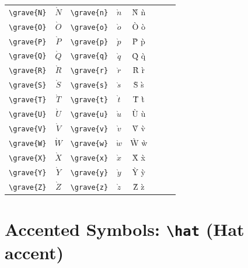 \documentclass[12pt,a4paper]{article}
\begin{document}
\begin{longtable}{|l|c|l|c|c|l|c|c|}
\verb|\grave{N}| & $\grave{N}$     & \verb|\grave{n}| & $\grave{n}$     & Ǹ ǹ            &                  &                 & \\
\verb|\grave{O}| & $\grave{O}$     & \verb|\grave{o}| & $\grave{o}$     & Ò ò            &                  &                 & \\
\verb|\grave{P}| & $\grave{P}$     & \verb|\grave{p}| & $\grave{p}$     & P̀ p̀            &                  &                 & \\
\verb|\grave{Q}| & $\grave{Q}$     & \verb|\grave{q}| & $\grave{q}$     & Q̀ q̀            &                  &                 & \\
\verb|\grave{R}| & $\grave{R}$     & \verb|\grave{r}| & $\grave{r}$     & R̀ r̀            &                  &                 & \\
\verb|\grave{S}| & $\grave{S}$     & \verb|\grave{s}| & $\grave{s}$     & S̀ s̀            &                  &                 & \\
\verb|\grave{T}| & $\grave{T}$     & \verb|\grave{t}| & $\grave{t}$     & T̀ t̀            &                  &                 & \\
\verb|\grave{U}| & $\grave{U}$     & \verb|\grave{u}| & $\grave{u}$     & Ù ù            &                  &                 & \\
\verb|\grave{V}| & $\grave{V}$     & \verb|\grave{v}| & $\grave{v}$     & V̀ v̀            &                  &                 & \\
\verb|\grave{W}| & $\grave{W}$     & \verb|\grave{w}| & $\grave{w}$     & Ẁ ẁ            &                  &                 & \\
\verb|\grave{X}| & $\grave{X}$     & \verb|\grave{x}| & $\grave{x}$     & X̀ x̀            &                  &                 & \\
\verb|\grave{Y}| & $\grave{Y}$     & \verb|\grave{y}| & $\grave{y}$     & Ỳ ỳ            &                  &                 & \\
\verb|\grave{Z}| & $\grave{Z}$     & \verb|\grave{z}| & $\grave{z}$     & Z̀ z̀            &                  &                 & \\
\hline
\end{longtable}

\newpage

\section*{Accented Symbols: \texttt{\textbackslash hat} (Hat accent)}
\end{document}
